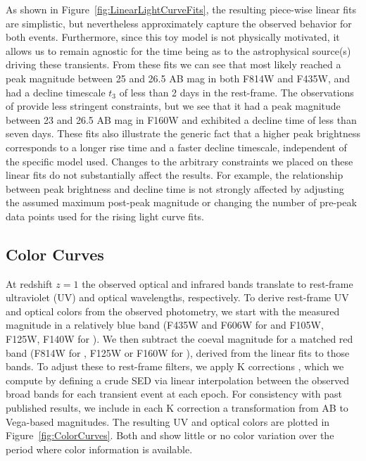 As shown in Figure~\ref{fig:LinearLightCurveFits}, the resulting
piece-wise linear fits are simplistic, but nevertheless approximately
capture the observed behavior for both events.  Furthermore, since
this toy model is not physically motivated, it allows us to remain
agnostic for the time being as to the astrophysical source(s) driving
these transients.  From these fits we can see that \spockone most
likely reached a peak magnitude between 25 and 26.5 AB mag in both
F814W and F435W, and had a decline timescale $t_3$ of less than 2 days
in the rest-frame. The observations of \spocktwo provide less
stringent constraints, but we see that it had a peak magnitude between
23 and 26.5 AB mag in F160W and exhibited a decline time of less than
seven days.  These fits also illustrate the generic fact that a higher
peak brightness corresponds to a longer rise time and a faster decline
timescale, independent of the specific model used.  Changes to the
arbitrary constraints we placed on these linear fits do not
substantially affect the results.  For example, the relationship
between peak brightness and decline time is not strongly affected by
adjusting the assumed maximum post-peak magnitude or changing the
number of pre-peak data points used for the rising light curve fits.


\subsection{Color Curves}

At redshift $z=1$ the observed optical and infrared bands translate to
rest-frame ultraviolet (UV) and optical wavelengths, respectively.  To
derive rest-frame UV and optical colors from the observed photometry,
we start with the measured magnitude in a relatively blue band (F435W
and F606W for \spockone and F105W, F125W, F140W for \spocktwo).  We
then subtract the coeval magnitude for a matched red band (F814W for
\spockone, F125W or F160W for \spocktwo), derived from the linear fits
to those bands.  To adjust these to rest-frame filters, we apply K
corrections \citep[following][]{Hogg:2002}, which we compute by
defining a crude SED via linear interpolation between the observed
broad bands for each transient event at each epoch.  For consistency
with past published results, we include in each K correction a
transformation from AB to Vega-based magnitudes.  The resulting UV and
optical colors are plotted in Figure~\ref{fig:ColorCurves}.  Both
\spockone and \spocktwo show little or no color variation over the
period where color information is available.  


